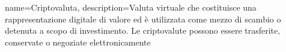 {
	name={Criptovaluta},
	description={Valuta virtuale che costituisce una rappresentazione digitale di valore ed è utilizzata come mezzo di scambio o detenuta a scopo di investimento. Le criptovalute possono essere trasferite, conservate o negoziate elettronicamente}
}
